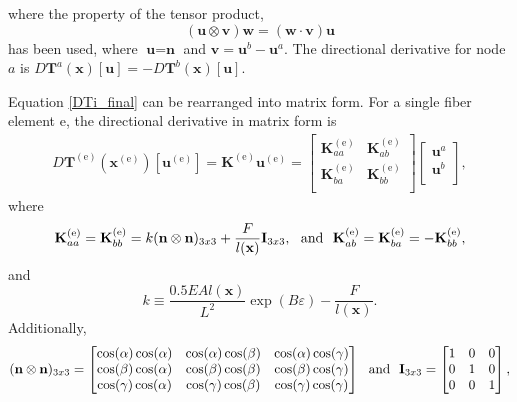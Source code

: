 \documentclass[12pt,aps,pre]{revtex4}
\begin{document}
%
where the property of the tensor product,
%
\begin{equation}
(\textbf{u} \otimes \textbf{v})\textbf{w} = (\textbf{w} \cdot \textbf{v})\textbf{u}
\end{equation}
%
has been used, where $\textbf{u} = \textbf{n}$ and $\textbf{v} = \textbf{u}^b-\textbf{u}^a$. The directional derivative for node $a$ is $D \textbf{T}^a(\textbf{x})[\textbf{u}] = - D\textbf{T}^b(\textbf{x})[\textbf{u}]$.

Equation \eqref{DTi_final} can be rearranged into matrix form. For a single fiber element e, the directional derivative in matrix form is 
%
\begin{eqnarray}
D\textbf{T}^{(\text{e})}(\textbf{x}^{(\text{e})})[\textbf{u}^{(\text{e})}] = \textbf{K}^{(\text{e})}\textbf{u}^{(\text{e})} = 
\begin{bmatrix} 
\textbf{K}^{(\text{e})}_{aa} & \textbf{K}^{(\text{e})}_{ab} \\ 
\textbf{K}^{(\text{e})}_{ba}& \textbf{K}^{(\text{e})}_{bb} \\
\end{bmatrix}
\begin{bmatrix} 
\textbf{u}^{a}  \\ 
\textbf{u}^{b} \\ 
\end{bmatrix},
\label{DT^e_matrix}
\end{eqnarray}
%
where
%
\begin{equation}
\textbf{K}^{(\text{e})}_{aa} = \textbf{K}^{(\text{e})}_{bb} = k (\textbf{n} \otimes \textbf{n})_{3x3} + \frac{F}{l(\textbf{x})}\textbf{\text{I}}_{3x3}, \ \ \text{and} \ \ \textbf{K}^{(\text{e})}_{ab} = \textbf{K}^{(\text{e})}_{ba} = -\textbf{K}^{(\text{e})}_{bb},
\label{K_aa}
\end{equation}
%
and
%
\begin{equation}
k \equiv \frac{0.5E A  l(\textbf{x})}{L^2} \exp(B \varepsilon) -\frac{F}{l(\textbf{x})}.
\label{k}
\end{equation}
%
Additionally, 
%
\begin{eqnarray}
(\textbf{n} \otimes \textbf{n})_{3x3} = 
\begin{bmatrix}
\cos(\alpha)\cos(\alpha) & \cos(\alpha) \cos(\beta) & \cos(\alpha) \cos(\gamma) \\
\cos(\beta)\cos(\alpha) & \cos(\beta)\cos(\beta) & \cos(\beta)\cos(\gamma) \\
\cos(\gamma)\cos(\alpha) & \cos(\gamma)\cos(\beta) & \cos(\gamma)\cos(\gamma) 
\end{bmatrix} \ \ \text{and} \ \
%
\textbf{\text{I}}_{3x3} =
\begin{bmatrix}
1 & 0 & 0 \\
0 & 1 & 0 \\
0 & 0 & 1
\end{bmatrix},
\end{eqnarray}
\end{document}
